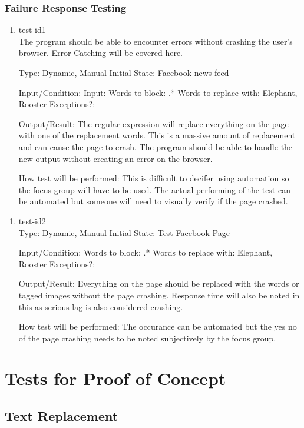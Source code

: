 \documentclass[12pt, titlepage]{article}
\begin{document}
\subsubsection{Failure Response Testing} %
\begin{enumerate}
\item{test-id1\\}
The program should be able to encounter errors without crashing the user's browser. Error Catching will be covered here.

Type: Dynamic, Manual
Initial State: Facebook news feed
					
Input/Condition: Input: Words to block: .*
Words to replace with: Elephant, Rooster
Exceptions?: 
					
Output/Result: The regular expression will replace everything on the page with one of the replacement words. This is a massive amount of replacement and can cause the page to crash. The program should be able to handle the new output without creating an error on the browser.
					
How test will be performed: This is difficult to decifer using automation so the focus group will have to be used. The actual performing of the test can be automated but someone will need to visually verify if the page crashed.
\end{enumerate}
\begin{enumerate}
\item{test-id2\\}
Type: Dynamic, Manual
Initial State: Test Facebook Page
					
Input/Condition: Words to block: .*
Words to replace with: Elephant, Rooster
Exceptions?: 
					
Output/Result: Everything on the page should be replaced with the words or tagged images without the page crashing. Response time will also be noted in this as serious lag is also considered crashing.
					
How test will be performed: The occurance can be automated but the yes no of the page crashing needs to be noted subjectively by the focus group.
\end{enumerate}
\section{Tests for Proof of Concept}
\subsection{Text Replacement}
		
\end{document}
